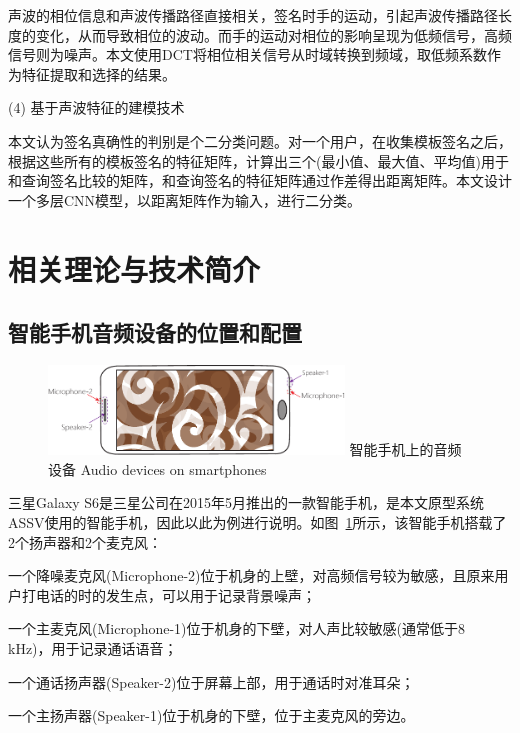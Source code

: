 声波的相位信息和声波传播路径直接相关，签名时手的运动，引起声波传播路径长度的变化，从而导致相位的波动。而手的运动对相位的影响呈现为低频信号，高频信号则为噪声。本文使用DCT将相位相关信号从时域转换到频域，取低频系数作为特征提取和选择的结果。

(4) 基于声波特征的建模技术

本文认为签名真确性的判别是个二分类问题。对一个用户，在收集模板签名之后，根据这些所有的模板签名的特征矩阵，计算出三个(最小值、最大值、平均值)用于和查询签名比较的矩阵，和查询签名的特征矩阵通过作差得出距离矩阵。本文设计一个多层CNN模型，以距离矩阵作为输入，进行二分类。

\section{相关理论与技术简介}

\subsection{智能手机音频设备的位置和配置}
\begin{figure}[!htp]
  \centering
  \includegraphics[width=0.7\textwidth]{figure/smartphone.pdf}
  \bicaption
    {智能手机上的音频设备}
    {Audio devices on smartphones}
  \label{fig:audio-device-smartphone}
\end{figure}

三星Galaxy S6是三星公司在2015年5月推出的一款智能手机，是本文原型系统ASSV使用的智能手机，因此以此为例进行说明。如图~\ref{fig:audio-device-smartphone}所示，该智能手机搭载了2个扬声器和2个麦克风：
\begin{enumerate*}[label=\alph*)]
    \item 一个降噪麦克风(Microphone-2)位于机身的上壁，对高频信号较为敏感，且原来用户打电话的时的发生点，可以用于记录背景噪声；
    \item 一个主麦克风(Microphone-1)位于机身的下壁，对人声比较敏感(通常低于8 kHz)，用于记录通话语音；
    \item 一个通话扬声器(Speaker-2)位于屏幕上部，用于通话时对准耳朵；
    \item 一个主扬声器(Speaker-1)位于机身的下壁，位于主麦克风的旁边。
\end{enumerate*}

